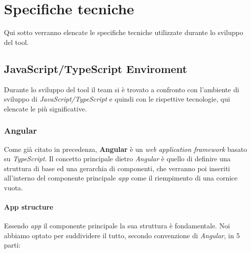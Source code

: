 \documentclass[twoside]{supsistudent}
\begin{document}
\chapter{Specifiche tecniche}

Qui sotto verranno elencate le specifiche tecniche utilizzate durante lo
sviluppo del tool.

\section{JavaScript/TypeScript Enviroment}

Durante lo sviluppo del tool il team si è trovato a confronto con l'ambiente
di sviluppo di \textit{JavaScript/TypeScript} e quindi con le rispettive 
tecnologie, qui elencate le più significative.

\subsection{Angular}

Come già citato in precedenza, \textbf{Angular} è un \textit{web application
framework} basato su \textit{TypeScript}. Il concetto principale dietro 
\textit{Angular} è quello di definire una struttura di base ed una gerarchia
di componenti, che verranno poi inseriti all'interno del componente principale
\textit{app} come il riempimento di una cornice vuota.

\subsubsection{App structure}

Essendo \textit{app} il componente principale la sua struttura è fondamentale.
Noi abbiamo optato per suddividere il tutto, secondo convenzione di 
\textit{Angular}, in 5 parti:
\end{document}
